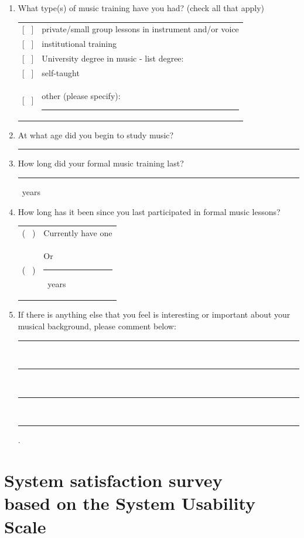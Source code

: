 \documentclass[a4paper,11pt]{article}
\newcommand{\myunderline}{\rule{2in}{.5pt}}
\begin{document}
{\begin{appendices}
\begin{enumerate}[resume]
	\item What type(s) of music training have you had? (check all that apply)

	\begin{tabular}{l l}
		{[{ \ }]} & private/small group lessons in instrument and/or voice \\
		{[{ \ }]} & institutional training \\
		{[{ \ }]} & University degree in music - list degree: \\
		{[{ \ }]} & self-taught \\
		{[{ \ }]} & other (please specify): \myunderline \\
	\end{tabular}

 	\item At what age did you begin to study music?

 	\myunderline

 	\item How long did your formal music training last?

 	\myunderline \ years
 	\item How long has it been since you last participated in formal music lessons?

	\begin{tabular}{l l}
		( \ ) & Currently have one \\
		( \ ) & Or \myunderline \ years \\
	\end{tabular}

	\item \label{appendix:music:after_break}If there is anything else that you feel is interesting or important about your musical background, please comment below:

	\rule{4.5in}{.5pt} \\
	\rule{4.5in}{.5pt} \\
	\rule{4.5in}{.5pt} \\
	\rule{4.5in}{.5pt}.

\end{enumerate}

\section[System satisfaction survey]{System satisfaction survey\\
	{\normalsize based on the System Usability Scale}}


\end{appendices}}
\end{document}
